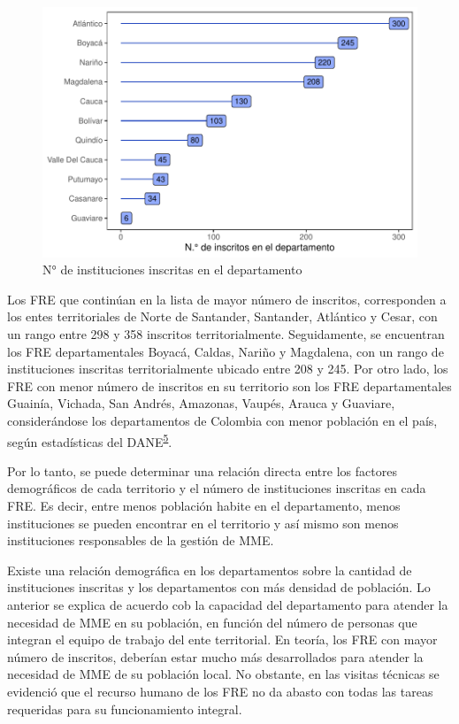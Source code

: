 \documentclass[
]{book}
\begin{document}
\begin{figure}

{\centering \includegraphics[width=0.9\linewidth]{InformeFinal_files/figure-latex/institucionesInscritas-1} 

}

\caption{N° de instituciones inscritas en el departamento}\label{fig:institucionesInscritas}
\end{figure}

Los FRE que continúan en la lista de mayor número de inscritos, corresponden a los entes territoriales de Norte de Santander, Santander, Atlántico y Cesar, con un rango entre 298 y 358 inscritos territorialmente. Seguidamente, se encuentran los FRE departamentales Boyacá, Caldas, Nariño y Magdalena, con un rango de instituciones inscritas territorialmente ubicado entre 208 y 245. Por otro lado, los FRE con menor número de inscritos en su territorio son los FRE departamentales Guainía, Vichada, San Andrés, Amazonas, Vaupés, Arauca y Guaviare, considerándose los departamentos de Colombia con menor población en el país, según estadísticas del DANE\textsuperscript{\protect\hyperlink{ref-DANE2021}{5}}.

Por lo tanto, se puede determinar una relación directa entre los factores demográficos de cada territorio y el número de instituciones inscritas en cada FRE. Es decir, entre menos población habite en el departamento, menos instituciones se pueden encontrar en el territorio y así mismo son menos instituciones responsables de la gestión de MME.

Existe una relación demográfica en los departamentos sobre la cantidad de instituciones inscritas y los departamentos con más densidad de población. Lo anterior se explica de acuerdo cob la capacidad del departamento para atender la necesidad de MME en su población, en función del número de personas que integran el equipo de trabajo del ente territorial. En teoría, los FRE con mayor número de inscritos, deberían estar mucho más desarrollados para atender la necesidad de MME de su población local. No obstante, en las visitas técnicas se evidenció que el recurso humano de los FRE no da abasto con todas las tareas requeridas para su funcionamiento integral.
\end{document}
